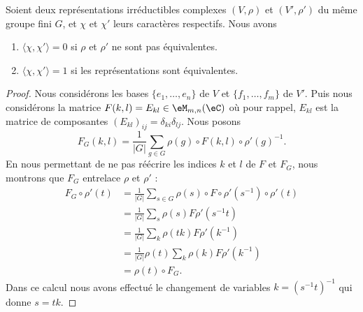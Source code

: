 \begin{proposition} \label{PropJzbfWi}
	Soient deux représentations irréductibles complexes \( (V,\rho)\) et \( (V',\rho')\) du même groupe fini \( G\), et \( \chi\) et \( \chi'\) leurs caractères respectifs. Nous avons
	\begin{enumerate}
		\item
		      \( \langle \chi, \chi'\rangle =0\) si \( \rho\) et \( \rho'\) ne sont pas équivalentes.
		\item
		      \( \langle \chi, \chi'\rangle =1\) si les représentations sont équivalentes.
	\end{enumerate}
\end{proposition}

\begin{proof}
	Nous considérons les bases \( \{ e_1,\ldots, e_n \} \) de \( V\) et \( \{ f_1,\ldots, f_m \}\) de \( V'\). Puis nous considérons la matrice \( F(k,l)=E_{kl}\in\eM_{m,n}(\eC)\) où pour rappel, \( E_{kl}\) est la matrice de composantes \( (E_{kl})_{ij}=\delta_{ki}\delta_{lj}\). Nous posons
	\begin{equation}
		F_G(k,l)=\frac{1}{ | G | }\sum_{g\in G}\rho(g)\circ F(k,l)\circ\rho'(g)^{-1}.
	\end{equation}
	En nous permettant de ne pas réécrire les indices \( k\) et \(l \) de \( F\) et \( F_G\), nous montrons que \( F_G\) entrelace \( \rho\) et \( \rho'\) :
	\begin{subequations}
		\begin{align}
			F_G\circ\rho'(t) & =\frac{1}{ | G | }\sum_{s\in G}\rho(s)\circ F\circ \rho'(s^{-1})\circ \rho'(t) \\
			                 & =\frac{1}{ | G | }\sum_s\rho(s)F\rho'(s^{-1} t)                                \\
			                 & =\frac{1}{ | G | }\sum_{k}\rho(tk)F\rho'(k^{-1})                               \\
			                 & =\frac{1}{ | G | }\rho(t) \sum_k\rho(k)F\rho'(k^{-1})                          \\
			                 & =\rho(t)\circ F_G.
		\end{align}
	\end{subequations}
	Dans ce calcul nous avons effectué le changement de variables \( k=(s^{-1} t)^{-1}\) qui donne \( s=tk\).


\end{proof}
